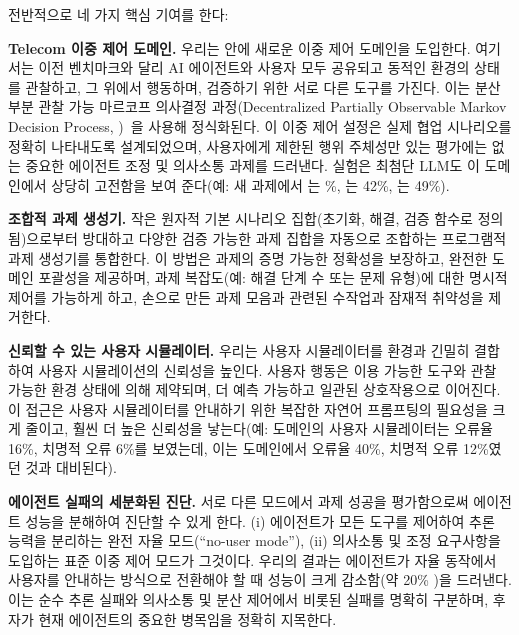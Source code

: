 전반적으로  네 가지 핵심 기여를 한다:

\textbf{Telecom 이중 제어 도메인.} 우리는 \bench 안에 새로운 이중 제어 \telecom 도메인을 도입한다. 여기서는 이전 벤치마크와 달리 AI 에이전트와 사용자 모두 공유되고 동적인 환경의 상태를 관찰하고, 그 위에서 행동하며, 검증하기 위한 서로 다른 도구를 가진다. 이는 분산 부분 관찰 가능 마르코프 의사결정 과정(Decentralized Partially Observable Markov Decision Process, \decpomdp)~\cite{oliehoek2016concise}을 사용해 정식화된다. 이 이중 제어 설정은 실제 협업 시나리오를 정확히 나타내도록 설계되었으며, 사용자에게 제한된 행위 주체성만 있는 평가에는 없는 중요한 에이전트 조정 및 의사소통 과제를 드러낸다. 실험은 최첨단 LLM도 이 도메인에서 상당히 고전함을 보여 준다(예: 새 과제에서 \gptmodelshort \cite{gpt41}는 \%, \ofourmodelshort \cite{o4mini}는 42\%, \claudesonnetshort \cite{claude37sonnet}는 49\%).

\textbf{조합적 과제 생성기.}  작은 원자적 기본 시나리오 집합(초기화, 해결, 검증 함수로 정의됨)으로부터 방대하고 다양한 검증 가능한 과제 집합을 자동으로 조합하는 프로그램적 과제 생성기를 통합한다. 이 방법은 과제의 증명 가능한 정확성을 보장하고, 완전한 도메인 포괄성을 제공하며, 과제 복잡도(예: 해결 단계 수 또는 문제 유형)에 대한 명시적 제어를 가능하게 하고, 손으로 만든 과제 모음과 관련된 수작업과 잠재적 취약성을 제거한다.

\textbf{신뢰할 수 있는 사용자 시뮬레이터.} 우리는 사용자 시뮬레이터를 환경과 긴밀히 결합하여 사용자 시뮬레이션의 신뢰성을 높인다. 사용자 행동은 이용 가능한 도구와 관찰 가능한 환경 상태에 의해 제약되며, 더 예측 가능하고 일관된 상호작용으로 이어진다. 이 접근은 사용자 시뮬레이터를 안내하기 위한 복잡한 자연어 프롬프팅의 필요성을 크게 줄이고, 훨씬 더 높은 신뢰성을 낳는다(예: \telecom 도메인의 사용자 시뮬레이터는 오류율 16\%, 치명적 오류 6\%를 보였는데, 이는  \retail 도메인에서 오류율 40\%, 치명적 오류 12\%였던 것과 대비된다).

 \textbf{에이전트 실패의 세분화된 진단.}  서로 다른 모드에서 과제 성공을 평가함으로써 에이전트 성능을 분해하여 진단할 수 있게 한다. (i) 에이전트가 모든 도구를 제어하여 추론 능력을 분리하는 완전 자율 모드(``no-user mode''), (ii) 의사소통 및 조정 요구사항을 도입하는 표준 이중 제어 모드가 그것이다. 우리의 결과는 에이전트가 자율 동작에서 사용자를 안내하는 방식으로 전환해야 할 때 성능이 크게 감소함(약 20\% \passone)을 드러낸다. 이는 순수 추론 실패와 의사소통 및 분산 제어에서 비롯된 실패를 명확히 구분하며, 후자가 현재 에이전트의 중요한 병목임을 정확히 지목한다.


